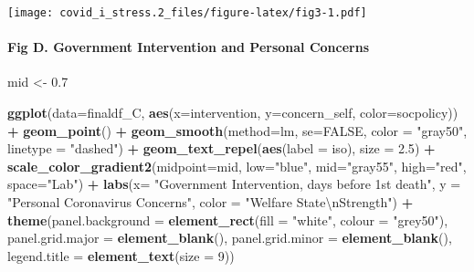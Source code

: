 \documentclass[
]{article}
\newenvironment{Shaded}{\begin{snugshade}}{\end{snugshade}}
\newcommand{\CharTok}[1]{\textcolor[rgb]{0.31,0.60,0.02}{#1}}
\newcommand{\DataTypeTok}[1]{\textcolor[rgb]{0.13,0.29,0.53}{#1}}
\newcommand{\DecValTok}[1]{\textcolor[rgb]{0.00,0.00,0.81}{#1}}
\newcommand{\FloatTok}[1]{\textcolor[rgb]{0.00,0.00,0.81}{#1}}
\newcommand{\KeywordTok}[1]{\textcolor[rgb]{0.13,0.29,0.53}{\textbf{#1}}}
\newcommand{\NormalTok}[1]{#1}
\newcommand{\OperatorTok}[1]{\textcolor[rgb]{0.81,0.36,0.00}{\textbf{#1}}}
\newcommand{\OtherTok}[1]{\textcolor[rgb]{0.56,0.35,0.01}{#1}}
\newcommand{\StringTok}[1]{\textcolor[rgb]{0.31,0.60,0.02}{#1}}
\begin{document}
\texttt{[image: covid\_i\_stress.2\_files/figure-latex/fig3-1.pdf]}

\hypertarget{fig-d.-government-intervention-and-personal-concerns}{%
\paragraph{Fig D. Government Intervention and Personal
Concerns}\label{fig-d.-government-intervention-and-personal-concerns}}

\begin{Shaded}
\begin{Highlighting}[]
\NormalTok{mid <-}\StringTok{ }\FloatTok{0.7}

\KeywordTok{ggplot}\NormalTok{(}\DataTypeTok{data=}\NormalTok{finaldf_C, }\KeywordTok{aes}\NormalTok{(}\DataTypeTok{x=}\NormalTok{intervention, }\DataTypeTok{y=}\NormalTok{concern_self, }\DataTypeTok{color=}\NormalTok{socpolicy)) }\OperatorTok{+}
\StringTok{  }\KeywordTok{geom_point}\NormalTok{() }\OperatorTok{+}
\StringTok{  }\KeywordTok{geom_smooth}\NormalTok{(}\DataTypeTok{method=}\NormalTok{lm, }\DataTypeTok{se=}\OtherTok{FALSE}\NormalTok{, }\DataTypeTok{color =} \StringTok{"gray50"}\NormalTok{, }\DataTypeTok{linetype =} \StringTok{"dashed"}\NormalTok{) }\OperatorTok{+}
\StringTok{  }\KeywordTok{geom_text_repel}\NormalTok{(}\KeywordTok{aes}\NormalTok{(}\DataTypeTok{label =}\NormalTok{ iso), }\DataTypeTok{size =} \FloatTok{2.5}\NormalTok{) }\OperatorTok{+}
\StringTok{  }\KeywordTok{scale_color_gradient2}\NormalTok{(}\DataTypeTok{midpoint=}\NormalTok{mid, }\DataTypeTok{low=}\StringTok{"blue"}\NormalTok{, }\DataTypeTok{mid=}\StringTok{"gray55"}\NormalTok{, }\DataTypeTok{high=}\StringTok{"red"}\NormalTok{, }\DataTypeTok{space=}\StringTok{"Lab"}\NormalTok{) }\OperatorTok{+}
\StringTok{  }\KeywordTok{labs}\NormalTok{(}\DataTypeTok{x=} \StringTok{"Government Intervention, days before 1st death"}\NormalTok{, }\DataTypeTok{y =} \StringTok{"Personal Coronavirus Concerns"}\NormalTok{, }\DataTypeTok{color =} \StringTok{"Welfare State}\CharTok{\textbackslash{}n}\StringTok{Strength"}\NormalTok{) }\OperatorTok{+}
\StringTok{      }\KeywordTok{theme}\NormalTok{(}\DataTypeTok{panel.background =} \KeywordTok{element_rect}\NormalTok{(}\DataTypeTok{fill =} \StringTok{"white"}\NormalTok{, }\DataTypeTok{colour =} \StringTok{"grey50"}\NormalTok{),}
        \DataTypeTok{panel.grid.major =} \KeywordTok{element_blank}\NormalTok{(),}
        \DataTypeTok{panel.grid.minor =} \KeywordTok{element_blank}\NormalTok{(),}
        \DataTypeTok{legend.title =} \KeywordTok{element_text}\NormalTok{(}\DataTypeTok{size =} \DecValTok{9}\NormalTok{))}
\end{Highlighting}
\end{Shaded}
\end{document}
